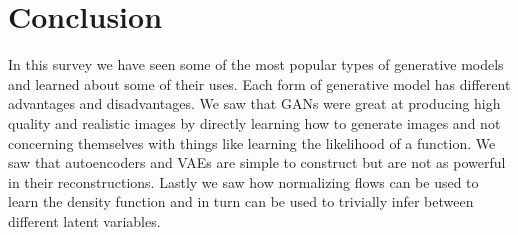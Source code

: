 \section{Conclusion}
In this survey we have seen some of the most popular types of generative models
and learned about some of their uses. Each form of generative model has
different advantages and disadvantages. We saw that GANs were great at producing
high quality and realistic images by directly learning how to generate images
and not concerning themselves with things like learning the likelihood of a
function. We saw that autoencoders and VAEs are simple to construct but are not
as powerful in their reconstructions. Lastly we saw how normalizing flows can be
used to learn the density function and in turn can be used to trivially infer
between different latent variables.
